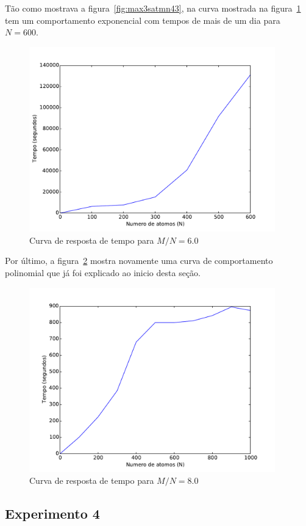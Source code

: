 		Tão como mostrava a figura~\ref{fig:max3satmn43}, na curva mostrada na figura~\ref{fig:max3satmn60} tem um comportamento exponencial com tempos de mais de um dia para $N=600$.
		\begin{figure}[H]
			\centering
			\includegraphics[height=8cm]{images/max3sat_mn60}
			\caption{Curva de resposta de tempo para $M/N=6.0$}
			\label{fig:max3satmn60}
		\end{figure}
		
		Por último, a figura~\ref{fig:max3satmn80} mostra novamente uma curva de comportamento polinomial que já foi explicado ao inicio desta seção.
		\begin{figure}[H]
			\centering
			\includegraphics[height=8cm]{images/max3sat_mn80}
			\caption{Curva de resposta de tempo para $M/N=8.0$}
			\label{fig:max3satmn80}
		\end{figure}

\subsection{Experimento 4}
